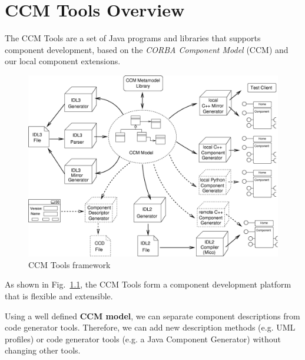 
\chapter{CCM Tools Overview}

The CCM Tools are a set of Java programs and libraries
that supports component development, based on the {\it CORBA Component
Model} (CCM) \cite{CCMSpecification} and our local component extensions. 

\begin{figure}[htbp]
    \begin{center}
        \includegraphics [width=12cm,angle=0] {ComponentGeneratorTools}
        \caption{CCM Tools framework}
        \label{ccmtools}
    \end{center}
\end{figure}

As shown in Fig.~\ref{ccmtools}, the CCM Tools form a component development 
platform that is flexible and extensible.


\newpage
Using a well defined {\bf CCM model}, we can separate component descriptions 
from code generator tools. Therefore, we can add new description methods (e.g.
UML profiles) or code generator tools (e.g. a Java Component Generator) without 
changing other tools.

